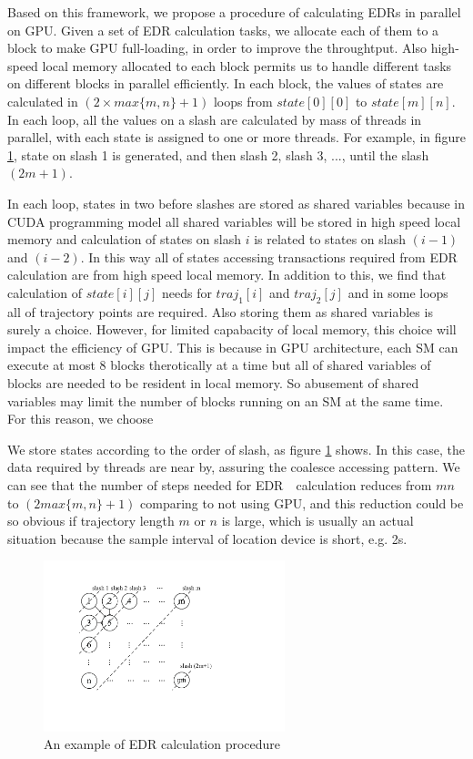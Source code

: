 \documentclass[conference]{IEEEtran}
\begin{document}
Based on this framework, we propose a procedure of calculating EDRs in parallel on GPU. Given a set of EDR calculation tasks, we allocate each of them to a block to make GPU full-loading, in order to improve the throughtput. Also high-speed local memory allocated to each block permits us to handle different tasks on different blocks in parallel efficiently. In each block, the values of states are calculated in $(2\times max\{m,n\}+1)$ loops from $state[0][0]$ to $state[m][n]$. In each loop, all the values on a slash are calculated by mass of threads in parallel, with each state is assigned to one or more threads. For example, in figure \ref{fig:DPstate}, state on slash 1 is generated, and then slash 2, slash 3, ..., until the slash $(2m+1)$. 

In each loop, states in two before slashes are stored as shared variables because in CUDA programming model all shared variables will be stored in high speed local memory and calculation of states on slash $i$ is related to states on slash $(i-1)$ and $(i-2)$. In this way all of states accessing transactions required from EDR calculation are from high speed local memory. In addition to this, we find that calculation of $state[i][j]$ needs for $traj_1[i]$ and $traj_2[j]$ and in some loops all of trajectory points are required. Also storing them as shared variables is surely a choice. However, for limited capabacity of local memory, this choice will impact the efficiency of GPU. This is because in GPU architecture, each SM can execute at most 8 blocks therotically at a time but all of shared variables of blocks are needed to be resident in local memory. So abusement of shared variables may limit the number of blocks running on an SM at the same time. For this reason, we choose 

We store states according to the order of slash, as figure \ref{fig:DPstate} shows. In this case, the data required by threads are near by, assuring the coalesce accessing pattern. We can see that the number of steps needed for EDR　calculation reduces from $mn$ to $(2max\{m,n\}+1)$ comparing to not using GPU, and this reduction could be so obvious if trajectory length $m$ or $n$ is large, which is usually an actual situation because the sample interval of location device is short, e.g. 2s.

\begin{figure}[!t]\centering
	\includegraphics[width=7cm]{pdf/DPstate.pdf}
	\caption{An example of EDR calculation procedure\label{fig:DPstate}}
\end{figure}
\end{document}

